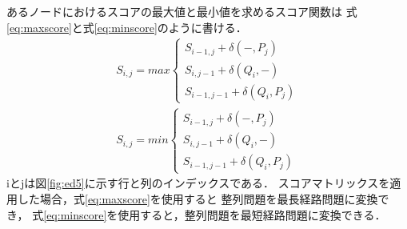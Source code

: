 あるノードにおけるスコアの最大値と最小値を求めるスコア関数は
式\ref{eq:maxscore}と式\ref{eq:minscore}のように書ける．
\begin{subequations}
\begin{align}
S_{i,j}= max \left \{
\begin{array}{l}
S_{i-1,j}+\delta(-,P_{j}) \\
S_{i,j-1}+\delta(Q_{i},-) \\
S_{i-1,j-1}+\delta(Q_{i},P_{j})
\end{array}
\right.\label{eq:maxscore} \\
S_{i,j}= min \left \{
\begin{array}{l}
S_{i-1,j}+\delta(-,P_{j}) \\
S_{i,j-1}+\delta(Q_{i},-) \\
S_{i-1,j-1}+\delta(Q_{i},P_{j})
\end{array}
\right.\label{eq:minscore}
\end{align}
\label{eq:minmaxscore}
\end{subequations}
iとjは図\ref{fig:ed5}に示す行と列のインデックスである．
スコアマトリックスを適用した場合，式\ref{eq:maxscore}を使用すると
整列問題を最長経路問題に変換でき，
式\ref{eq:minscore}を使用すると，整列問題を最短経路問題に変換できる．

